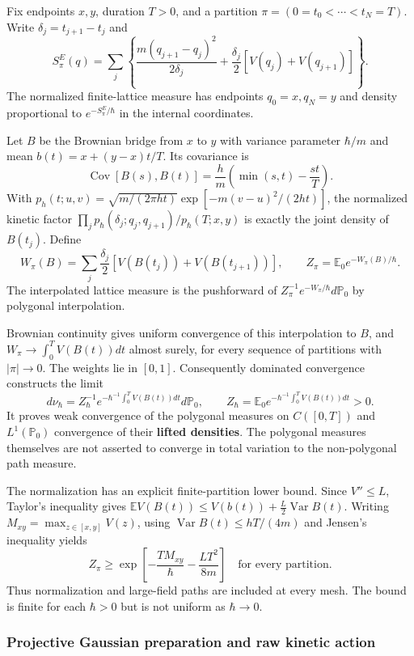 \documentclass[11pt,a4paper]{article}
\begin{document}
Fix endpoints \(x,y\), duration \(T>0\), and a partition
\(\pi=(0=t_0<\cdots<t_N=T)\). Write \(\delta_j=t_{j+1}-t_j\) and \[
 S_\pi^E(q)=\sum_j
 \left\{\frac{m(q_{j+1}-q_j)^2}{2\delta_j}
 +\frac{\delta_j}{2}[V(q_j)+V(q_{j+1})]\right\}.
 \tag{5}
\] The normalized finite-lattice measure has endpoints \(q_0=x,q_N=y\)
and density proportional to \(e^{-S_\pi^E/\hbar}\) in the internal
coordinates.

Let \(B\) be the Brownian bridge from \(x\) to \(y\) with variance
parameter \(\hbar/m\) and mean \(b(t)=x+(y-x)t/T\). Its covariance is
\[\operatorname{Cov}[B(s),B(t)]
=\frac hm\left(\min(s,t)-\frac{st}{T}\right).\tag{6}\] With
\(p_h(t;u,v)=\sqrt{m/(2\pi ht)}  \exp[-m(v-u)^2/(2ht)]\), the normalized
kinetic factor \(\prod_jp_\hbar(\delta_j;q_j,q_{j+1})/p_\hbar(T;x,y)\)
is exactly the joint density of \(B(t_j)\). Define
\[W_\pi(B)=\sum_j\frac{\delta_j}{2}
       [V(B(t_j))+V(B(t_{j+1}))],\qquad
 Z_\pi=\mathbb E_0e^{-W_\pi(B)/\hbar}.\tag{7}\] The interpolated lattice
measure is the pushforward of \(Z_\pi^{-1}e^{-W_\pi/\hbar}d\mathbb P_0\)
by polygonal interpolation.

Brownian continuity gives uniform convergence of this interpolation to
\(B\), and \(W_\pi\to\int_0^T V(B(t))dt\) almost surely, for every
sequence of partitions with \(|\pi|\to0\). The weights lie in \([0,1]\).
Consequently dominated convergence constructs the limit
\[d\nu_\hbar=Z_\hbar^{-1}
 e^{-\hbar^{-1}\int_0^T V(B(t))dt}d\mathbb P_0,\qquad
 Z_\hbar=\mathbb E_0e^{-\hbar^{-1}\int_0^T V(B(t))dt}>0.\tag{8}\] It
proves weak convergence of the polygonal measures on \(C([0,T])\) and
\(L^1(\mathbb P_0)\) convergence of their \textbf{lifted densities}. The
polygonal measures themselves are not asserted to converge in total
variation to the non-polygonal path measure.

The normalization has an explicit finite-partition lower bound. Since
\(V''\le L\), Taylor's inequality gives
\(\mathbb EV(B(t))\le V(b(t))+\frac L2\operatorname{Var}B(t)\). Writing
\(M_{xy}=\max_{z\in[x,y]}V(z)\), using
\(\operatorname{Var}B(t)\le hT/(4m)\) and Jensen's inequality yields
\[Z_\pi\ge
 \exp\!\left[-\frac{TM_{xy}}\hbar-\frac{LT^2}{8m}\right]
 \quad\text{for every partition.}\tag{9}\] Thus normalization and
large-field paths are included at every mesh. The bound is finite for
each \(\hbar>0\) but is not uniform as \(\hbar\to0\).

\hypertarget{projective-gaussian-preparation-and-raw-kinetic-action}{%
\subsubsection{Projective Gaussian preparation and raw kinetic
action}\label{projective-gaussian-preparation-and-raw-kinetic-action}}
\end{document}
